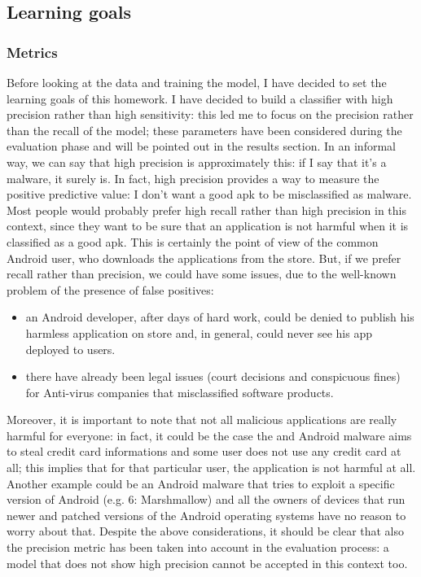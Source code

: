 \documentclass[12pt]{article}
\begin{document}
\subsection{Learning goals}
\subsubsection{Metrics}
Before looking at the data and training the model, I have decided to set the learning goals of this homework. I have decided to build a classifier with high precision rather than high sensitivity: this led me to focus on the precision rather than the recall of the model; these parameters have been considered during the evaluation phase and will be pointed out in the results section.
In an informal way, we can say that high precision is approximately this: if I say that it's a malware, it surely is. In fact, high precision provides a way to measure the positive predictive value: I don't want a good apk to be misclassified as malware.
Most people would probably prefer high recall rather than high precision in this context, since they want to be sure that an application is not harmful when it is classified as a good apk. This is certainly the point of view of the common Android user, who downloads the applications from the store. But, if we prefer recall rather than precision, we could have some issues, due to the well-known problem of the presence of false positives:
\begin{itemize}
\item an Android developer, after days of hard work, could be denied to publish his harmless application on store and, in general, could never see his app deployed to users.
\item there have already been legal issues (court decisions and conspicuous fines) for Anti-virus companies that misclassified software products.
\end{itemize}
Moreover, it is important to note that not all malicious applications are really harmful for everyone: in fact, it could be the case the and Android malware aims to steal credit card informations and some user does not use any credit card at all; this implies that for that particular user, the application is not harmful at all. Another example could be an Android malware that tries to exploit a specific version of Android (e.g. 6: Marshmallow) and all the owners of devices that run newer and patched versions of the Android operating systems have no reason to worry about that. Despite the above considerations, it should be clear that also the precision metric has been taken into account in the evaluation process: a model that does not show high precision cannot be accepted in this context too.
\end{document}
